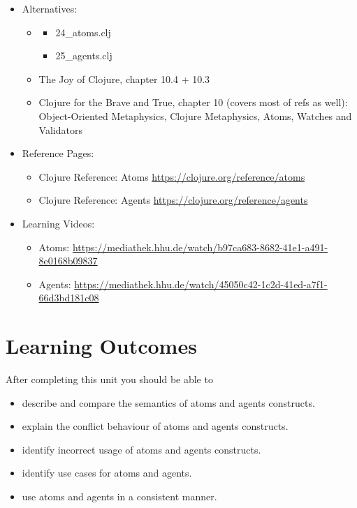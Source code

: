 \documentclass[11pt,a4paper]{article}
\begin{document}
\begin{itemize}
    \item Alternatives:
        \begin{itemize}
            \item \begin{itemize}
                \item 24\_atoms.clj
                \item 25\_agents.clj
            \end{itemize}
            \item The Joy of Clojure, chapter 10.4 + 10.3
            \item Clojure for the Brave and True, chapter 10 (covers most of refs as well): Object-Oriented Metaphysics, Clojure Metaphysics, Atoms, Watches and Validators
        \end{itemize}
    \item Reference Pages:
        \begin{itemize}
    \item Clojure Reference: Atoms \url{https://clojure.org/reference/atoms}
    \item Clojure Reference: Agents \url{https://clojure.org/reference/agents}
        \end{itemize}
    \item Learning Videos:
        \begin{itemize}
    \item Atoms: \url{https://mediathek.hhu.de/watch/b97ca683-8682-41e1-a491-8e0168b09837}
    \item Agents: \url{https://mediathek.hhu.de/watch/45050c42-1c2d-41ed-a7f1-66d3bd181c08}
        \end{itemize}
\end{itemize}


\section{Learning Outcomes}

After completing this unit you should be able to

\begin{itemize}
	\item describe and compare the semantics of atoms and agents constructs.
    \item explain the conflict behaviour of atoms and agents constructs.
    \item identify incorrect usage of atoms and agents constructs.
    \item identify use cases for atoms and agents.
    \item use atoms and agents in a consistent manner.
\end{itemize}
\end{document}
